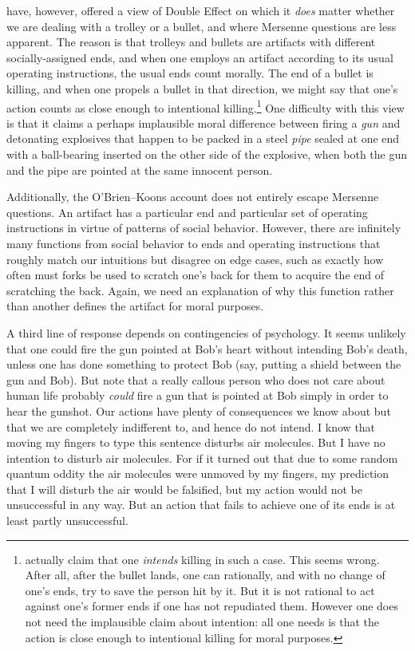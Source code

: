  have, however, offered a view of Double Effect on which it \textit{does} matter whether we are dealing with 
a trolley or a bullet, and where Mersenne questions are less apparent. The reason is that trolleys and bullets are artifacts with different socially-assigned ends, and when 
one employs an artifact according to its usual operating instructions, the usual ends count morally. The end of a bullet is
killing, and when one propels a bullet in that direction, we might say that one's action counts as close enough to intentional 
killing.\footnote{ actually claim that one \textit{intends} killing in such a case. This seems wrong. After all,
after the bullet lands, one can rationally, and with no change of one's ends, try to save the person hit by it. 
But it is not rational to act against one's former ends if one has not repudiated them. However one does not need the implausible
claim about intention: all one needs is that the action is close enough to intentional killing for moral purposes.} One
difficulty with this view is that it claims a perhaps implausible moral difference between firing a \textit{gun} and detonating explosives that happen to be
packed in a steel \textit{pipe} sealed at one end with a ball-bearing inserted on the other side of the explosive,
when both the gun and the pipe are pointed at the same innocent person.  

Additionally, the O'Brien--Koons account does not entirely escape Mersenne questions. An artifact has a particular
end and particular set of operating instructions in virtue of patterns of social behavior. However, there are infinitely many functions 
from social behavior to ends and operating instructions that roughly match our intuitions but disagree on edge cases, such as exactly
how often must forks be used to scratch one's back for them to acquire the end of scratching the back. Again, we need an explanation
of why this function rather than another defines the artifact for moral purposes.

A third line of response depends on contingencies of psychology. It seems unlikely that one could fire the gun pointed at Bob's heart
without intending Bob's death, unless one has done something to protect Bob (say, putting a shield between the gun and Bob). 
But note that a really callous person who does not care about human life probably \textit{could} fire a gun that is 
pointed at Bob simply in order to hear the gunshot. Our actions have
plenty of consequences we know about but that we are completely indifferent to, and hence do not intend. I know that moving
my fingers to type this sentence disturbs air molecules. But I have no intention to disturb air molecules. For if it turned out
that due to some random quantum oddity the air molecules were unmoved by my fingers, my prediction that I will disturb the
air would be falsified, but my action would not be unsuccessful in any way. But an action that fails to achieve one of its
ends is at least partly unsuccessful. 

